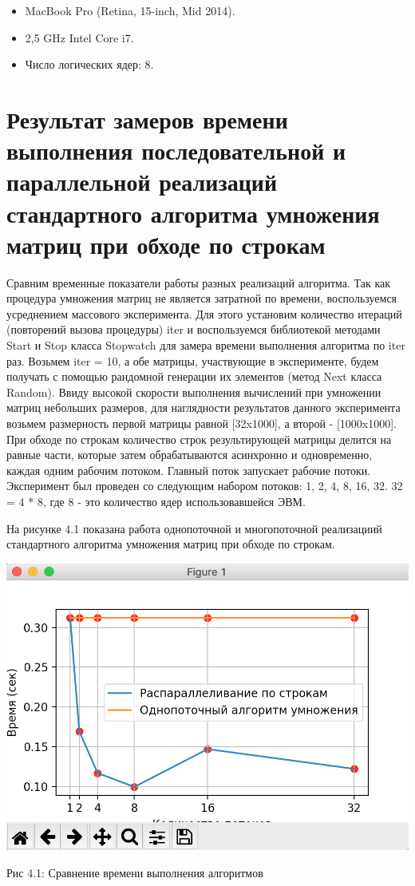 \documentclass[12pt]{report}
\begin{document}
\begin{itemize}
	\item MacBook Pro (Retina, 15-inch, Mid 2014).
	\item 2,5 GHz Intel Core i7.
	\item Число логических ядер: 8.
\end{itemize}

\section{Результат замеров времени выполнения последовательной и параллельной реализаций стандартного алгоритма умножения матриц при обходе по строкам} 

Сравним временные показатели работы разных реализаций алгоритма. Так как процедура умножения матриц не является затратной по времени, воспользуемся усреднением массового эксперимента. Для этого установим количество итераций (повторений вызова процедуры) iter и воспользуемся библиотекой методами Start и Stop класса Stopwatch для замера времени выполнения алгоритма по iter раз. Возьмем iter = 10, а обе матрицы, участвующие в эксперименте, будем получать с помощью рандомной генерации их элементов (метод Next класса Random).
Ввиду высокой скорости выполнения вычислений при умножении матриц небольших размеров, для наглядности результатов данного эксперимента возьмем размерность первой матрицы равной [32x1000], а второй - [1000x1000]. При обходе по строкам количество строк результирующей матрицы делится на равные части, которые затем обрабатываются асинхронно и одновременно, каждая одним рабочим потоком. Главный поток запускает рабочие потоки. Эксперимент был проведен со следующим набором потоков: 1, 2, 4, 8, 16, 32. 32 = 4 * 8, где 8 - это количество ядер использовавшейся ЭВМ.

На рисунке 4.1 показана работа однопоточной и многопоточной реализациий стандартного алгоритма умножения матриц при обходе по строкам.

\begin{center}
		\includegraphics[scale=0.6]{pics/Parallel1.png}
		
			Рис 4.1: Сравнение времени выполнения алгоритмов
\end{center}
\end{document}

